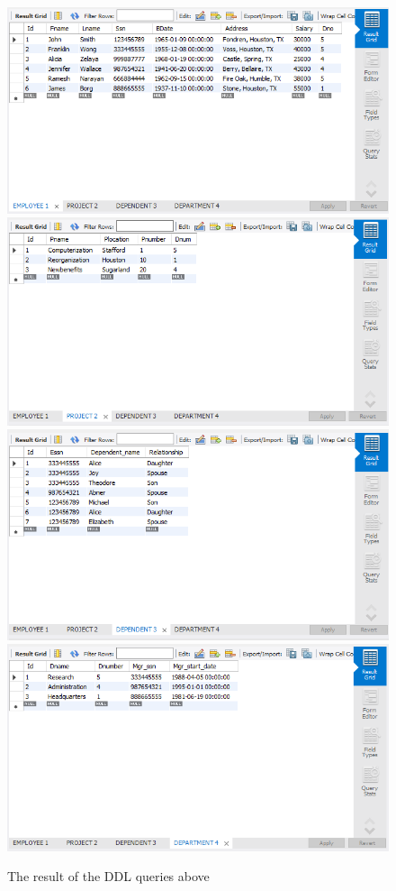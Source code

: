 \documentclass[12pt,titlepage]{article}
\begin{document}
\begin{figure}[H]
    \includegraphics[width=.5\textwidth]{images/figures/fig3a.png}
    \includegraphics[width=.5\textwidth]{images/figures/fig3b.png}
    \includegraphics[width=.5\textwidth]{images/figures/fig3c.png}
    \includegraphics[width=.5\textwidth]{images/figures/fig3d.png}
    \caption{The result of the DDL queries above}
\end{figure}
\end{document}

